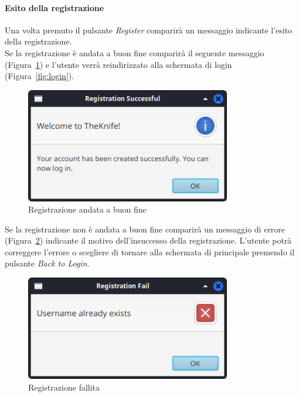 \paragraph{Esito della registrazione}
Una volta premuto il pulsante \emph{Register} comparirà un
messaggio indicante l'esito della registrazione.\\
Se la registrazione è andata a buon fine comparirà il seguente 
messaggio (Figura~\ref{fig:registration-ok}) e l'utente verrà reindirizzato alla schermata di 
login (Figura~\ref{fig:login}).
\begin{figure}[H]
    \centering
    \includegraphics[width=0.8\textwidth]{images/r-ok.png}
    \caption{Registrazione andata a buon fine}
    \label{fig:registration-ok}
\end{figure}
Se la registrazione non è andata a buon fine comparirà 
un messaggio di errore (Figura~\ref{fig:registration-ko}) 
indicante il motivo dell'insuccesso della registrazione.
L'utente potrà correggere l'errore o scegliere di tornare alla
schermata di principale premendo il pulsante \emph{Back to Login}.
\begin{figure}[H]
    \centering
    \includegraphics[width=0.8\textwidth]{images/r-ko.png}
    \caption{Registrazione fallita}
    \label{fig:registration-ko}
\end{figure}

